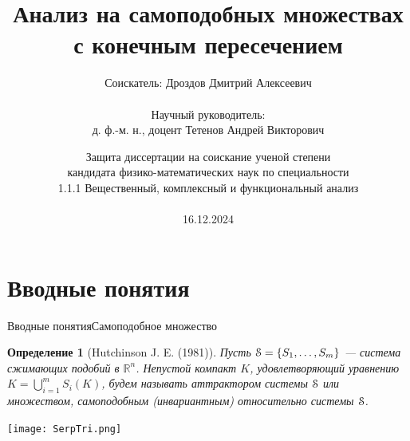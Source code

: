 \documentclass[aspectratio=1610, 10pt, notheorems]{beamer}
\title[ ]
    {Анализ на самоподобных множествах с конечным пересечением}
\author[ ]
    {Соискатель: Дроздов Дмитрий Алексеевич\\ \; \\
    Научный руководитель:\\ 
    д. ф.-м. н., доцент Тетенов Андрей Викторович}
\institute[ИМ СО РАН]{Институт математики имени С. Л. Соболева СО РАН, Новосибирск}
\date[10.06.2024]
    {Защита диссертации на соискание ученой степени\\ кандидата физико-математических наук по специальности \\1.1.1 Вещественный, комплексный и функциональный анализ\\ \; \\
    16.12.2024}
\newtheorem{definition}  {Определение}
\begin{document}
\begin{frame}{}
    \titlepage
\end{frame}



\section{Вводные понятия} %


\begin{frame}{Вводные понятия}{Самоподобное множество}
    \begin{definition}[Hutchinson J. E. (1981)]
        Пусть ${\EuScript S}=\{S_1, \ldots, S_m\}$ --- система сжимающих подобий в $\mathbb{R}^n$.  
        Непустой компакт $K$, удовлетворяющий уравнению  $K=\bigcup\limits_{i=1}^m S_i(K)$, будем называть {\em аттрактором системы} ${\EuScript S}$ или множеством, самоподобным (инвариантным) относительно системы ${\EuScript S}$.
    \end{definition}
    \begin{center}
    \texttt{[image: SerpTri.png]}
    \end{center}
\end{frame}
\end{document}
